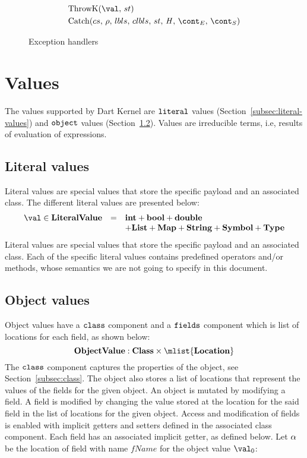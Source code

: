 \documentclass[a4paper,oneside]{article}
\begin{document}
\begin{figure}[Htp]
  \begin{align}
    &\ThrowH{\val}{\strace} \label{handle:throw} \\
    &\CatchH{cs} \label{handle:catch}
  \end{align}
  \caption{Exception handlers}
  \label{figure:handlers}
\end{figure}


\section{Values}
\label{sec:values}

The values supported by Dart Kernel are $\tt{literal}$ values (Section~\ref{subsec:literal-values}) and $\tt{object}$ values (Section~\ref{subsec:object-values}).
Values are irreducible terms, i.e, results of evaluation of expressions.


\subsection{Literal values}
\label{subsubsec:literal-values}

Literal values are special values that store the specific payload and an associated class.
The different literal values are presented below:
\[
  \begin{array}{lcl}
    \val \in \dlitval &=& \mathbf{int} + \mathbf{bool} + \mathbf{double}\\
    && + \mathbf{List} + \mathbf{Map} + \mathbf{String} + \mathbf{Symbol} + \mathbf{Type}
  \end{array}
\]
Literal values are special values that store the specific payload and an associated class.
Each of the specific literal values contains predefined operators and/or methods, whose semantics we are not going to specify in this document.


\subsection{Object values}
\label{subsec:object-values}

Object values have a $\tt{class}$ component and a $\tt{fields}$ component which is list of locations for each field, as shown below:
\[
    \dobjval : \dclass \times \mlist{\dlocation}
\]
The $\tt{class}$ component captures the properties of the object, see Section~\eqref{subsec:class}.
The object also stores a list of locations that represent the values of the fields for the given object.
An object is mutated by modifying a field.
A field is modified by changing the value stored at the location for the said field in the list of locations for the given object.
Access and modification of fields is enabled with implicit getters and setters defined in the associated class component.
Each field has an associated implicit getter, as defined below.
Let $\alpha$ be the location of field with name $fName$ for the object value $\val_0$:
\end{document}
